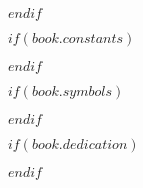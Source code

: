 $endif$

$if(book.constants)$



$endif$

$if(book.symbols)$



$endif$

$if(book.dedication)$

\dedicatory{} 

$endif$


\mainmatter %

\pagestyle{thesis} %
